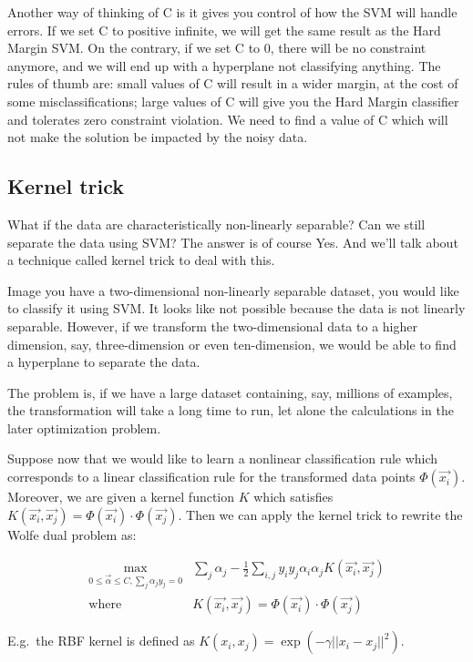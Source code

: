\documentclass{article}
\begin{document}
Another way of thinking of C is it gives you control of how the SVM will handle errors. If we set C to positive infinite, we will get the same result as the Hard Margin SVM. On the contrary, if we set C to 0, there will be no constraint anymore, and we will end up with a hyperplane not classifying anything. The rules of thumb are: small values of C will result in a wider margin, at the cost of some misclassifications; large values of C will give you the Hard Margin classifier and tolerates zero constraint violation. We need to find a value of C which will not make the solution be impacted by the noisy data.

\subsection{Kernel trick}
What if the data are characteristically non-linearly separable? Can we still separate the data using SVM? The answer is of course Yes. And we’ll talk about a technique called kernel trick to deal with this.

Image you have a two-dimensional non-linearly separable dataset, you would like to classify it using SVM. It looks like not possible because the data is not linearly separable. However, if we transform the two-dimensional data to a higher dimension, say, three-dimension or even ten-dimension, we would be able to find a hyperplane to separate the data.

The problem is, if we have a large dataset containing, say, millions of examples, the transformation will take a long time to run, let alone the calculations in the later optimization problem.


Suppose now that we would like to learn a nonlinear classification rule which corresponds to a linear classification rule for the transformed data points $\Phi (\vec{x_i})$. Moreover, we are given a kernel function $K$ which satisfies $K(\vec{x_i}, \vec{x_j}) = \Phi (\vec{x_i}) \cdot \Phi (\vec{x_j})$. Then we can apply the kernel trick to rewrite the Wolfe dual problem as:

\begin{align*}
\max_{0 \leq \vec{\alpha}\leq C, \sum_j \alpha_j y_j = 0} & \sum_j \alpha_j - \frac{1}{2} \sum_{i,j} y_iy_j\alpha_i\alpha_j K(\vec{x_i}, \vec{x_j}) \\
\mathrm{where} \quad & K(\vec{x_i}, \vec{x_j}) = \Phi (\vec{x_i}) \cdot \Phi (\vec{x_j})
\end{align*}


E.g.\ the RBF kernel is defined as $K(x_i,x_j)= \exp (- \gamma || x_i - x_j ||^2)$.
\end{document}
